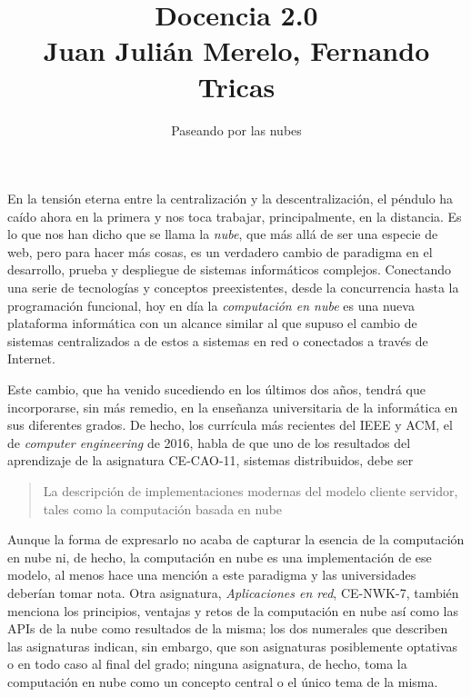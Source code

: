\documentclass[twoside,10pt]{article}
\title{Docencia 2.0\\ \large Juan Juli\'an Merelo, Fernando 
Tricas}
\author{\LARGE Paseando por las nubes}
\date{}
\newcounter{num}
\begin{document}
\addtocounter{page}{2}

\maketitle
\vspace*{-8ex}

\begin{multicols}{2}

  En la tensi\'on eterna entre la centralizaci\'on y la descentralizaci\'on,
  el p\'endulo ha ca\'ido ahora en la primera y nos toca trabajar,
  principalmente, en la distancia. Es lo que nos han dicho que se
  llama la {\em nube}, que m\'as all\'a de ser una especie de web, pero para hacer
  m\'as cosas, es un verdadero cambio de paradigma en el desarrollo,
  prueba y despliegue de sistemas inform\'aticos complejos. Conectando
  una serie de tecnolog\'ias y conceptos preexistentes, desde la
  concurrencia hasta la programaci\'on funcional, hoy en d\'ia la {\em
    computaci\'on en nube} es una nueva plataforma inform\'atica con un
  alcance similar al que supuso el cambio de sistemas centralizados a
  de estos a sistemas en red o conectados a trav\'es de Internet.

%


Este cambio, que ha venido sucediendo en los \'ultimos dos a\~nos, tendr\'a
que incorporarse, sin m\'as remedio, en la ense\~nanza universitaria de la
inform\'atica en sus diferentes grados. De hecho, los curr\'icula m\'as
recientes del IEEE y ACM, el de {\em computer engineering} de 2016, habla de
que uno de los resultados del aprendizaje de la asignatura CE-CAO-11,
sistemas distribuidos, debe ser
\begin{quote}
  La descripci\'on de implementaciones modernas del modelo cliente
  servidor, tales como la computaci\'on basada en nube
\end{quote}
Aunque la forma de expresarlo no acaba de capturar la esencia de la
computaci\'on en nube ni, de hecho, la computaci\'on en nube es una
implementaci\'on de ese modelo, al menos hace una menci\'on a este
paradigma y las universidades deber\'ian tomar nota. Otra asignatura,
{\em Aplicaciones en red}, CE-NWK-7, tambi\'en menciona los principios,
ventajas y retos de la computaci\'on en nube as\'i como las APIs de la
nube como resultados de la misma; los dos numerales que describen las
asignaturas indican, sin embargo, que son asignaturas posiblemente
optativas o en todo caso al final del grado; ninguna asignatura, de
hecho, toma la computaci\'on en nube como un concepto central o el \'unico
tema de la misma. 


\end{multicols}
\end{document}
